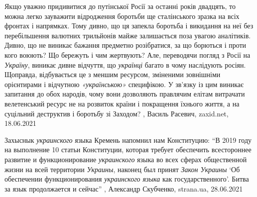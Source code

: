 Якщо уважно придивитися до путінської Росії за останні років двадцять, то можна
легко зауважити відродження боротьби ще сталінського зразка на всіх фронтах і
напрямках. Тому дивно, що ця запекла боротьба і викидання на неї без
перебільшення валютних трильйонів майже залишається поза увагою аналітиків.
Дивно, що не виникає бажання предметно розібратися, за що борються і проти кого
воюють? Що бережуть і чим жертвують?  Але, переводячи погляд з Росії на
\emph{Україну}, виникає дивне відчуття, що \emph{українці} багато в чому наслідують росіян.
Щоправда, відбувається це з меншим ресурсом, зміненими зовнішніми орієнтирами і
відчутною \emph{«українською»} специфікою. У зв’язку із цим виникає запитання до обох
народів, чому вони дозволяють правлячим елітам витрачати велетенський ресурс не
на розвиток країни і покращення їхнього життя, а на суцільний деструктив і
боротьбу зі Заходом?
, 
Василь Расевич, zaxid.net, 18.06.2021

Захыснык \emph{украинского} языка Кремень напомнил нам Конституцию: \enquote{В 2019 году на
выполнение 10 статьи Конституции, которая требует обеспечить всестороннее
развитие и функционирование \emph{украинского} языка во всех сферах общественной жизни
на всей территории \emph{Украины}, наконец был принят \emph{Закон Украины} \enquote{Об обеспечении
функционирования \emph{украинского языка} как государственного}. Битва за язык
продолжается и сейчас}
, 
Александр Скубченко, strana.ua, 28.06.2021

